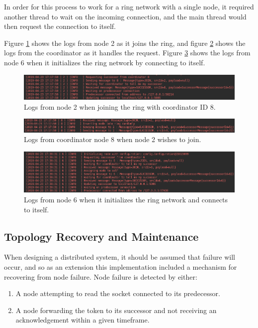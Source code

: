 \documentclass[12pt]{article}
\begin{document}
In order for this process to work for a ring network with a single node,
it required another thread to wait on the incoming connection, and the main thread
would then request the connection to itself. 

Figure \ref{fig:succreq} shows the logs from node 2 as it joins the ring, and figure \ref{fig:succreqcoord} shows the logs from the coordinator as it handles the request. Figure \ref{fig:singlenodejoin} shows the logs from node 6 when it initializes the ring network by connecting to itself.

\begin{figure}[!ht]
	\centering
	\includegraphics[width=\linewidth]{images/succreq}
	\caption{Logs from node 2 when joining the ring with coordinator ID 8.}
	\label{fig:succreq}
\end{figure}

\begin{figure}[!ht]
	\centering
	\includegraphics[width=\linewidth]{images/succreqcoord}
	\caption{Logs from coordinator node 8 when node 2 wishes to join.}
	\label{fig:succreqcoord}
\end{figure}

\begin{figure}[!ht]
	\centering
	\includegraphics[width=\linewidth]{images/singlenodejoin}
	\caption{Logs from node 6 when it initializes the ring network and connects to itself.}
	\label{fig:singlenodejoin}
\end{figure}

\subsection{Topology Recovery and Maintenance}

When designing a distributed system, it should be assumed that failure will occur, and so as an extension this implementation included a mechanism for recovering from node failure. Node failure is detected by either:
\begin{enumerate}
	\item A node attempting to read the socket connected to its predecessor.
	\item A node forwarding the token to its successor and not receiving an acknowledgement within a given timeframe.
\end{enumerate}
\end{document}
